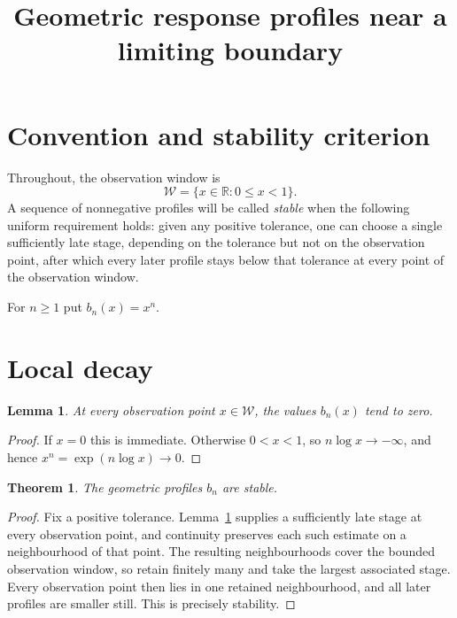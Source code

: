 \documentclass{article}
\title{Geometric response profiles near a limiting boundary}
\author{}
\date{}
\newtheorem{lemma}{Lemma}
\newtheorem{theorem}{Theorem}
\begin{document}
\maketitle

\section{Convention and stability criterion}

Throughout, the observation window is
\[
 \mathcal W=\{x\in\mathbb R:0\leq x<1\}.
\]
A sequence of nonnegative profiles will be called \emph{stable} when the
following uniform requirement holds: given any positive tolerance, one can
choose a single sufficiently late stage, depending on the tolerance but not
on the observation point, after which every later profile stays below that
tolerance at every point of the observation window.

For \(n\geq1\) put \(b_n(x)=x^n\).

\section{Local decay}

\begin{lemma}\label{lem:local-decay}
At every observation point \(x\in\mathcal W\), the values \(b_n(x)\) tend
to zero.
\end{lemma}

\begin{proof}
If \(x=0\) this is immediate. Otherwise \(0<x<1\), so
\(n\log x\to-\infty\), and hence \(x^n=\exp(n\log x)\to0\).
\end{proof}

\begin{theorem}\label{thm:uniform-decay}
The geometric profiles \(b_n\) are stable.
\end{theorem}

\begin{proof}
Fix a positive tolerance. Lemma~\ref{lem:local-decay} supplies a sufficiently
late stage at every observation point, and continuity preserves each such
estimate on a neighbourhood of that point. The resulting neighbourhoods
cover the bounded observation window, so retain finitely many and take the
largest associated stage. Every observation point then lies in one retained
neighbourhood, and all later profiles are smaller still. This is precisely
stability.
\end{proof}
\end{document}
